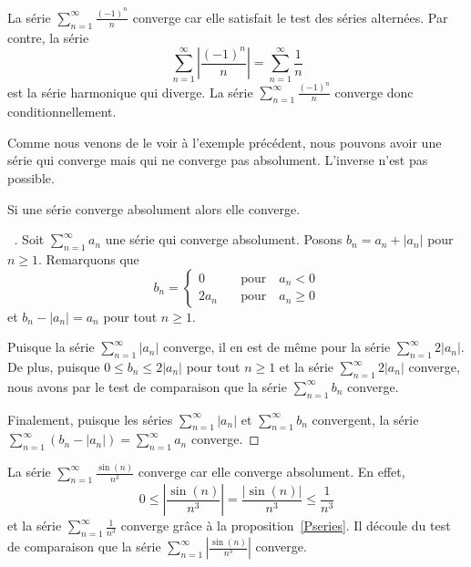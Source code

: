 {\begin{egg}
La série $\displaystyle \sum_{n=1}^\infty \frac{(-1)^n}{n}$ converge
car elle satisfait le test des séries alternées.  Par contre, la série
\[
\sum_{n=1}^\infty \left|\frac{(-1)^n}{n}\right| =
\sum_{n=1}^\infty \frac{1}{n}
\]
est la série harmonique qui diverge.  La série
$\displaystyle \sum_{n=1}^\infty \frac{(-1)^n}{n}$ converge donc
conditionnellement.
\end{egg}

Comme nous venons de le voir à l'exemple précédent, nous pouvons avoir une
série qui converge mais qui ne converge pas absolument.  L'inverse
n'est pas possible.

\begin{theorem}
Si une série converge absolument alors elle converge.
\end{theorem}

\begin{proof}[\UOproof\ \theory]
Soit $\displaystyle \sum_{n=1}^\infty a_n$ une série qui converge
absolument.  Posons $b_n = a_n + |a_n|$ pour $n\geq 1$.
Remarquons que
\[
b_n = \begin{cases}
0 & \quad \text{pour}\quad  a_n<0 \\
2 a_n & \quad \text{pour}\quad  a_n \geq 0
\end{cases}
\]
et $b_n - |a_n| = a_n$ pour tout $n\geq 1$.

Puisque la série $\displaystyle \sum_{n=1}^\infty |a_n|$ converge, il
en est de même pour la
série $\displaystyle \sum_{n=1}^\infty 2 |a_n|$.  De 
plus, puisque $0 \leq b_n \leq 2 |a_n|$ pour tout $n\geq 1$ et la
série $\displaystyle \sum_{n=1}^\infty 2 |a_n|$ converge, nous avons par le
test de comparaison que la série $\displaystyle \sum_{n=1}^\infty b_n$
converge.

Finalement, puisque les séries $\displaystyle \sum_{n=1}^\infty |a_n|$
et $\displaystyle \sum_{n=1}^\infty b_n$ convergent, la série
$\displaystyle \sum_{n=1}^\infty (b_n - |a_n|) = \sum_{n=1}^\infty a_n$
converge.
\end{proof}

\begin{egg}
La série $\displaystyle \sum_{n=1}^\infty \frac{\sin(n)}{n^3}$
converge car elle converge absolument.  En effet,
\[
0 \leq \left| \frac{\sin(n)}{n^3} \right|
= \frac{|\sin(n)|}{n^3} \leq \frac{1}{n^3}
\]
et la série $\displaystyle \sum_{n=1}^\infty \frac{1}{n^3}$ converge
grâce à la proposition~\ref{Pseries}.  Il découle du test de comparaison
que la série
$\displaystyle \sum_{n=1}^\infty \left| \frac{\sin(n)}{n^3} \right|$
converge.
\end{egg}

}
